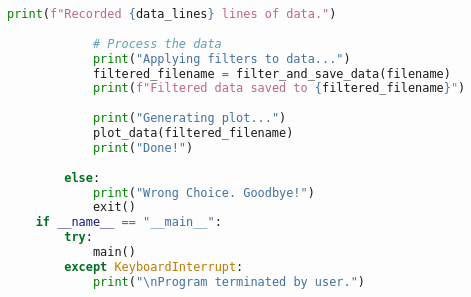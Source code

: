 \begin{lstlisting}[style=pythonstyle, caption=Python Serial Receive Script, label=lst:pythonCodeApp, language=Python ]
            print(f"Recorded {data_lines} lines of data.")
            
            # Process the data
            print("Applying filters to data...")
            filtered_filename = filter_and_save_data(filename)
            print(f"Filtered data saved to {filtered_filename}")
            
            print("Generating plot...")
            plot_data(filtered_filename)
            print("Done!")
            
        else:
            print("Wrong Choice. Goodbye!")
            exit()
    if __name__ == "__main__":
        try:
            main()
        except KeyboardInterrupt:
            print("\nProgram terminated by user.")
\end{lstlisting}